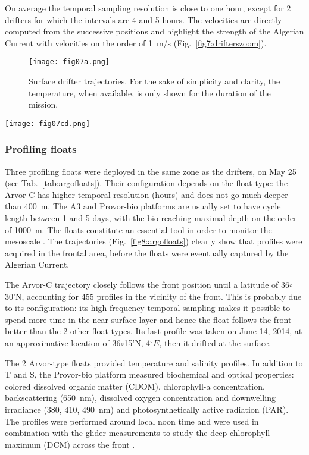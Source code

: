 \documentclass[essd]{copernicus}
\begin{document}
On average the temporal sampling resolution is close to one hour, except for 2 drifters for which the intervals are 4 and 5 hours. The velocities are directly computed from the successive positions and highlight the strength of the Algerian Current with velocities on the order of 1~m/s (Fig.~\ref{fig7:drifterszoom}).    

\begin{figure}[t]
\texttt{[image: fig07a.png]}
\caption{Surface drifter trajectories. For the sake of simplicity and clarity, the temperature, when available, is only shown for the duration of the mission.\label{fig3:drifters}}
\end{figure}

\begin{figure*}[h]
\texttt{[image: fig07cd.png]}
\caption{Drifter temperature (left-hand side) and velocity in the area of study.\label{fig7:drifterszoom}}
\end{figure*}


\subsubsection{Profiling floats}

Three profiling floats were deployed in the same zone as the drifters, on May 25 (see Tab.~\ref{tab:argofloats}). Their configuration depends on the float type: the Arvor-C has higher temporal resolution (hours) and does not go much deeper than 400~m. The A3 and Provor-bio platforms are usually set to have cycle length between 1 and 5 days, with the bio reaching maximal depth on the order of 1000~m. The floats constitute an essential tool in order to monitor the mesoscale \citep{SANCHEZROMAN17}. The trajectories (Fig.~\ref{fig8:argofloats}) clearly show that profiles were acquired in the frontal area, before the floats were eventually captured by the Algerian Current. 

The Arvor-C trajectory closely follows the front position until a latitude of 36$\circ$30'N, accounting for 455 profiles in the vicinity of the front. This is probably due to its configuration: its high frequency temporal sampling makes it possible to spend more time in the near-surface layer and hence the float follows the front better than the 2 other float types. Its last profile was taken on June 14, 2014, at an approximative location of 36$\circ$15'N, 4$^{\circ}E$, then it drifted at the surface.

The 2 Arvor-type floats provided temperature and salinity profiles. In addition to T and S, the Provor-bio platform measured biochemical and optical properties: colored dissolved organic matter (CDOM), chlorophyll-a concentration, backscattering (650~nm), dissolved oxygen concentration and downwelling  irradiance (380, 410, 490~nm) and photosynthetically active radiation (PAR). The profiles were performed around local noon time and were used in combination with the glider measurements to study the deep chlorophyll maximum (DCM) across the front \citep{OLITA17}.
\end{document}
